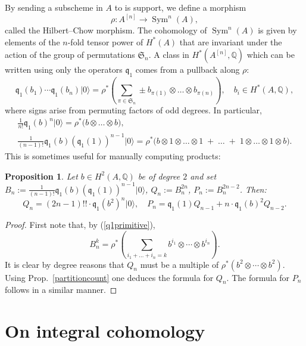 \documentclass{amsart}
\DeclareMathOperator{\Sym}{Sym}
\newcommand{\hilb}[1]{^{[#1]}}
\newcommand{\vac}{|0\rangle}
\newcommand{\q}{\mathfrak{q}}
\newcommand{\Q}{\mathbb{Q}}
\theoremstyle{plain}
\newtheorem{proposition}[theorem]{Proposition}
\theoremstyle{definition}
\theoremstyle{remark}
\begin{document}
By sending a subscheme in $A$ to is support, we define a morphism
$$
\rho : A\hilb{n} \longrightarrow \Sym^n(A),
$$
called the Hilbert--Chow morphism. The cohomology of $\Sym^n(A)$ is given by elements of the $n$-fold tensor power of $H^*(A)$ that are invariant under the action of the group of permutations $\mathfrak{S}_n$. A class in $H^*(A\hilb{n},\Q)$ which can be written using only the operators $\q_1$ comes from a pullback along $\rho$:
\begin{equation}
\label{qSym}
\q_1(b_1)\cdots \q_1(b_n)\vac = \rho^*\left( \sum_{\pi\in\mathfrak{S}_n } \pm b_{\pi(1)}\otimes\ldots\otimes b_{\pi(n)} \right), \quad b_i\in H^*(A,\Q),
\end{equation}
where signs arise from permuting factors of odd degrees. In particular,
\begin{gather} \label{q0primitive}
\frac{1}{n!}\q_1(b)^n \vac = \rho^*\big( b\otimes \ldots \otimes b\big),
\\ \label{q1primitive}
\frac{1}{(n-1)!}\q_1(b)\left(\q_1(1)\right)^{n-1}\vac =\rho^*\Big( b\otimes\! 1\!\otimes\ldots\otimes\! 1\; + \;\ldots\; +\; 1\!\otimes\ldots\otimes\! 1\! \otimes b\Big) .
\end{gather}
This is sometimes useful for manually computing products:
\begin{proposition}\label{qprimitivepower}
Let $b\in H^2(A,\Q)$ be of degree $2$ and set $B_n := \frac{1}{(n-1)!}\q_1(b)\left(\q_1(1)\right)^{n-1}\vac$, $Q_n:= B_n^{2n}$, $P_n :=B_n^{2n-2}$. Then:
\begin{equation*}
Q_n
= (2n-1)!! \cdot \q_1(b^2)^n\vac,
\quad
P_n = \q_1(1) Q_{n-1} + n\cdot \q_1(b)^2 Q_{n-2}.
\end{equation*}
\end{proposition}
\begin{proof} First note that, by (\ref{q1primitive}),
$$
B_n^k = \rho^*\left(\sum_{i_1+\ldots+i_n= k}b^{i_1}\otimes\cdots\otimes b^{i_n}\right).
$$
It is clear by degree reasons that $Q_n$ must be a multiple of $ \rho^*\left(b^2 \otimes \cdots \otimes b^2\right)$. Using Prop.~\ref{partitioncount} one deduces the formula for $Q_n$. 
The formula for $P_n$ follows in a similar manner.
\end{proof}


\section{On integral cohomology}
\end{document}

